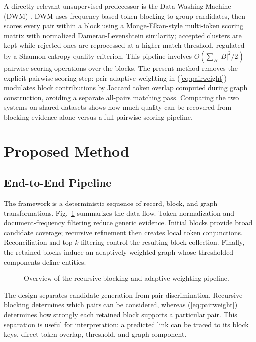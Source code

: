 \documentclass[conference]{IEEEtran}
\begin{document}
A directly relevant unsupervised predecessor is the Data Washing Machine (DWM) \cite{talburt2020}. DWM uses frequency-based token blocking to group candidates, then scores every pair within a block using a Monge-Elkan-style multi-token scoring matrix with normalized Damerau-Levenshtein similarity; accepted clusters are kept while rejected ones are reprocessed at a higher match threshold, regulated by a Shannon entropy quality criterion. This pipeline involves $O(\sum_B |B|^2 / 2)$ pairwise scoring operations over the blocks. The present method removes the explicit pairwise scoring step: pair-adaptive weighting in (\ref{eq:pairweight}) modulates block contributions by Jaccard token overlap computed during graph construction, avoiding a separate all-pairs matching pass. Comparing the two systems on shared datasets shows how much quality can be recovered from blocking evidence alone versus a full pairwise scoring pipeline.

\section{Proposed Method}
\subsection{End-to-End Pipeline}
The framework is a deterministic sequence of record, block, and graph transformations. Fig.~\ref{fig:pipeline} summarizes the data flow. Token normalization and document-frequency filtering reduce generic evidence. Initial blocks provide broad candidate coverage; recursive refinement then creates local token conjunctions. Reconciliation and top-$k$ filtering control the resulting block collection. Finally, the retained blocks induce an adaptively weighted graph whose thresholded components define entities.

\begin{figure}[t]
\centering
\setlength{\fboxsep}{3pt}
\caption{Overview of the recursive blocking and adaptive weighting pipeline.}
\label{fig:pipeline}
\end{figure}

The design separates candidate generation from pair discrimination. Recursive blocking determines which pairs can be considered, whereas (\ref{eq:pairweight}) determines how strongly each retained block supports a particular pair. This separation is useful for interpretation: a predicted link can be traced to its block keys, direct token overlap, threshold, and graph component.
\end{document}
